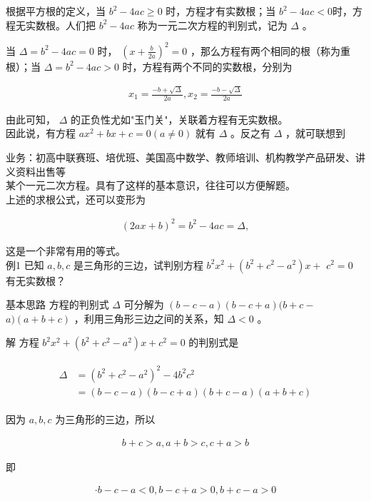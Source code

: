 \documentclass[10pt]{article}
\begin{document}
根据平方根的定义，当 $b^{2}-4 a c \geqslant 0$ 时，方程才有实数根；当 $b^{2}-4 a c<0$时，方程无实数根。人们把 $b^{2}-4 a c$ 称为一元二次方程的判别式，记为 $\Delta$ 。

当 $\Delta=b^{2}-4 a c=0$ 时， $\left(x+\frac{b}{2 a}\right)^{2}=0$ ，那么方程有两个相同的根（称为重根）；当 $\Delta=b^{2}-4 a c>0$ 时，方程有两个不同的实数根，分别为

\begin{align*}
x_{1}=\frac{-b+\sqrt{\Delta}}{2 a}, x_{2}=\frac{-b-\sqrt{\Delta}}{2 a}
\end{align*}

由此可知， $\Delta$ 的正负性尤如"玉门关"，关联着方程有无实数根。\\
因此说，有方程 $a x^{2}+b x+c=0(a \neq 0)$ 就有 $\Delta$ 。反之有 $\Delta$ ，就可联想到

业务：初高中联赛班、培优班、美国高中数学、教师培训、机构教学产品研发、讲义资料出售等\\
某个一元二次方程。具有了这样的基本意识，往往可以方便解题。\\
上述的求根公式，还可以变形为

\begin{align*}
(2 a x+b)^{2}=b^{2}-4 a c=\Delta,
\end{align*}

这是一个非常有用的等式。\\
例1 已知 $a, b, c$ 是三角形的三边，试判别方程 $b^{2} x^{2}+\left(b^{2}+c^{2}-a^{2}\right) x+$ $c^{2}=0$ 有无实数根？

基本思路 方程的判别式 $\Delta$ 可分解为 $(b-c-a)(b-c+a)(b+c-$ $a)(a+b+c)$ ，利用三角形三边之间的关系，知 $\Delta<0$ 。

解 方程 $b^{2} x^{2}+\left(b^{2}+c^{2}-a^{2}\right) x+c^{2}=0$ 的判别式是

\begin{align*}
\begin{aligned}
\Delta & =\left(b^{2}+c^{2}-a^{2}\right)^{2}-4 b^{2} c^{2} \\
& =(b-c-a)(b-c+a)(b+c-a)(a+b+c)
\end{aligned}
\end{align*}

因为 $a, b, c$ 为三角形的三边，所以

\begin{align*}
b+c>a, a+b>c, c+a>b
\end{align*}

即

\begin{align*}
\cdot b-c-a<0, b-c+a>0, b+c-a>0
\end{align*}
\end{document}
